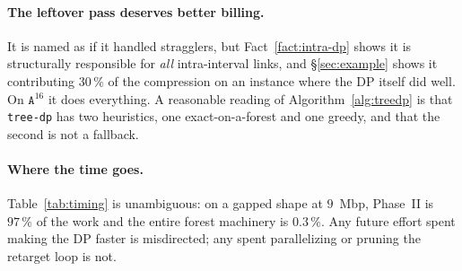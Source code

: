 \documentclass[11pt,a4paper]{article}
\theoremstyle{definition}
\theoremstyle{plain}
\theoremstyle{remark}
\begin{document}
\paragraph{The leftover pass deserves better billing.}
It is named as if it handled stragglers, but Fact~\ref{fact:intra-dp}
shows it is structurally responsible for \emph{all} intra-interval
links, and \S\ref{sec:example} shows it contributing $30\,\%$ of the
compression on an instance where the DP itself did well. On
$\mathtt{A}^{16}$ it does everything. A reasonable reading of
Algorithm~\ref{alg:treedp} is that \texttt{tree-dp} has two heuristics,
one exact-on-a-forest and one greedy, and that the second is not a
fallback.

\paragraph{Where the time goes.}
Table~\ref{tab:timing} is unambiguous: on a gapped shape at $9$~Mbp,
Phase~II is $97\,\%$ of the work and the entire forest machinery is
$0.3\,\%$. Any future effort spent making the DP faster is misdirected;
any spent parallelizing or pruning the retarget loop is not.
\end{document}
